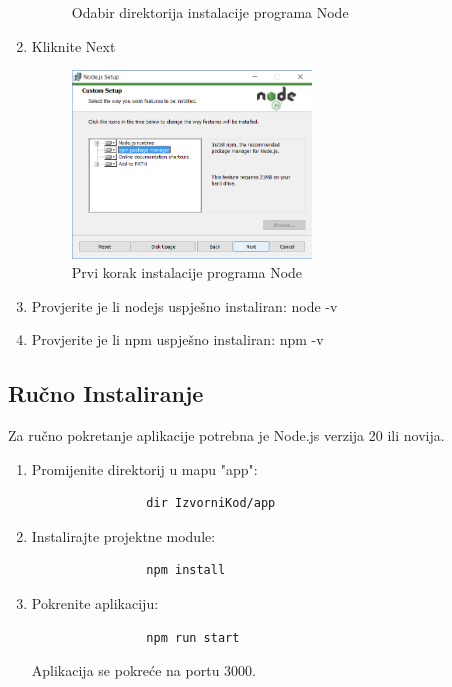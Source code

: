 \begin{enumerate}
\begin{figure}[h]
				\caption{Odabir direktorija instalacije programa Node}
				\label{fig:node_install_images}
			\end{figure}
			\item Kliknite Next
			\begin{figure}[h]
				\centering
				\includegraphics[width=0.6\textwidth]{slike/npm_install/3.png}
				\caption{Prvi korak instalacije programa Node}
				\label{fig:node_install_images}
			\end{figure}
			\item Provjerite je li nodejs uspješno instaliran:
			 \subitem node -v
			\item Provjerite je li npm uspješno instaliran:
			\subitem npm -v
		\end{enumerate}
		\subsection*{Ručno Instaliranje}
		Za ručno pokretanje aplikacije potrebna je Node.js verzija 20 ili novija.
		\begin{enumerate}
			\item Promijenite direktorij u mapu "app":
			\begin{verbatim}
				dir IzvorniKod/app 
			\end{verbatim}
			\item Instalirajte projektne module:
			\begin{verbatim}
				npm install
			\end{verbatim}
			\item Pokrenite aplikaciju:
			\begin{verbatim}
				npm run start
			\end{verbatim}
			Aplikacija se pokreće na portu 3000.
		\end{enumerate}
		\newpage
